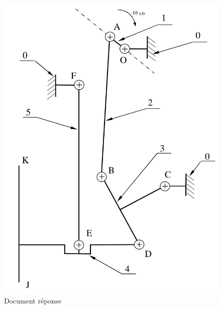 \begin{figure}[!h]
\begin{center}
\vspace{6cm}
\includegraphics[width=0.6\linewidth]{img/Batteur_s.png}
\vspace{6cm}
\caption{Document réponse}
\label{fig:image7}
\end{center}
\end{figure}

